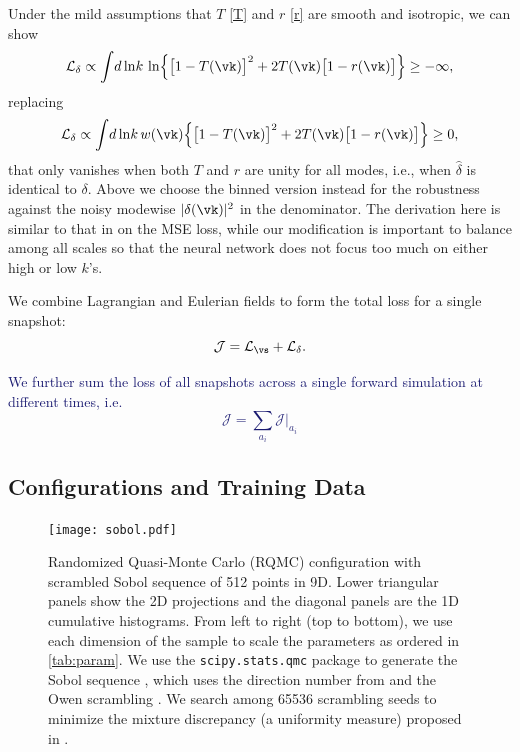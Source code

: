 \documentclass[modern, trackchanges, dvipsnames]{aastex631}
\renewcommand{\d}{d}
\newcommand{\cJ}{\mathcal{J}}
\newcommand{\cL}{\mathcal{L}}
\newcommand{\YZ}[1]{\textcolor{MidnightBlue}{#1}}
\begin{document}
Under the mild assumptions that $T$ \eqref{T} and $r$ \eqref{r} are smooth
and isotropic, we can show
%
\begin{equation}
\cL_\delta \propto \int \!\d\ln\!k\, \ln
\Bigl\{ \bigl[ 1 - T(\vk) \bigr]^2
  + 2 T(\vk) \bigl[ 1 - r(\vk) \bigr] \Bigr\} \geq -\infty,
\end{equation}
%
replacing
%
\begin{equation}
\cL_\delta \propto \int \!\d\ln\!k\, w(\vk)
\Bigl\{ \bigl[ 1 - T(\vk) \bigr]^2
  + 2 T(\vk) \bigl[ 1 - r(\vk) \bigr] \Bigr\} \geq 0,
\end{equation}
%
that only vanishes when both $T$ and $r$ are unity for all modes, i.e.,
when $\hat\delta$ is identical to $\delta$.
Above we choose the binned version instead for the robustness against
the noisy modewise $|\delta(\vk)|^2$ in the denominator.
The derivation here is similar to that in \citet{HeEtAl2019} on the MSE
loss, while our modification is important to balance among all scales so
that the neural network does not focus too much on either high or low
$k$'s.

We combine Lagrangian and Eulerian fields to form the total loss for a
single snapshot:
%
\begin{equation}
\cJ = \cL_\vs + \cL_\delta.
\end{equation}
%

\YZ{We further sum the loss of all snapshots across a single forward
simulation at different times, i.e.
\begin{equation}
\cJ = \sum_{a_i} \cJ |_{a_i}
\end{equation}
}


\vspace{1em}
\subsection{Configurations and Training Data}

\begin{figure}
  \centering
  \texttt{[image: sobol.pdf]}
  \caption{Randomized Quasi-Monte Carlo (RQMC) configuration with
    scrambled Sobol sequence of 512 points in 9D.
    Lower triangular panels show the 2D projections and the diagonal
    panels are the 1D cumulative histograms.
    From left to right (top to bottom), we use each dimension of the
    sample to scale the parameters as ordered in \autoref{tab:param}.
    We use the \texttt{scipy.stats.qmc} package \citep{SciPy} to
    generate the Sobol sequence \citep{Sobol1967}, which uses the
    direction number from \citet{JoeKuo2008} and the Owen scrambling
    \citep{Owen1998}.
    We search among 65536 scrambling seeds to minimize the mixture
    discrepancy (a uniformity measure) proposed in \citet{Zhou2013MD}.
  }
  \label{fig:sobol}
\end{figure}
\end{document}
